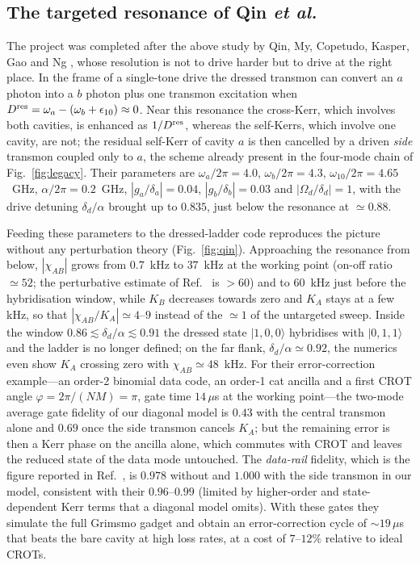 \documentclass[aps,pra,reprint,superscriptaddress,amsmath,amssymb,nofootinbib]{revtex4-2}
\newcommand{\ket}[1]{|#1\rangle}
\begin{document}
\subsection{The targeted resonance of Qin \emph{et al.}}
The project was completed after the above study by Qin, My, Copetudo,
Kasper, Gao and Ng \cite{qin2026}, whose resolution is not to drive harder
but to drive at the right place. In the frame of a single-tone drive the
dressed transmon can convert an $a$ photon into a $b$ photon plus one
transmon excitation when $D^{\rm res}=\omega_a-(\omega_b+\epsilon_{10})\approx0$.
Near this resonance the cross-Kerr, which involves both cavities, is
enhanced as $1/D^{\rm res}$, whereas the self-Kerrs, which involve one cavity,
are not; the residual self-Kerr of cavity $a$ is then cancelled by a driven
\emph{side} transmon coupled only to $a$, the scheme already present in the
four-mode chain of Fig.~\ref{fig:legacy}. Their parameters are
$\omega_a/2\pi=4.0$, $\omega_b/2\pi=4.3$, $\omega_{10}/2\pi=4.65$~GHz,
$\alpha/2\pi=0.2$~GHz, $|g_a/\delta_a|=0.04$, $|g_b/\delta_b|=0.03$ and
$|\Omega_d/\delta_d|=1$, with the drive detuning $\delta_d/\alpha$ brought
up to $0.835$, just below the resonance at $\simeq0.88$.

Feeding these parameters to the dressed-ladder code reproduces the picture
without any perturbation theory (Fig.~\ref{fig:qin}). Approaching the
resonance from below, $|\chi_{AB}|$ grows from $0.7$~kHz to $37$~kHz at the
working point (on-off ratio $\simeq52$; the perturbative estimate of
Ref.~\cite{qin2026} is $>60$) and to $60$~kHz just before the hybridisation
window, while $K_B$ decreases towards zero and $K_A$ stays at a few kHz, so
that $|\chi_{AB}/K_A|\simeq4$--$9$ instead of the $\simeq1$ of the untargeted
sweep. Inside the window $0.86\lesssim\delta_d/\alpha\lesssim0.91$ the dressed
state $\ket{1,0,0}$ hybridises with $\ket{0,1,1}$ and the ladder is no longer
defined; on the far flank, $\delta_d/\alpha\simeq0.92$, the numerics even show
$K_A$ crossing zero with $\chi_{AB}\simeq48$~kHz. For their
error-correction example---an order-2 binomial data code, an order-1 cat
ancilla and a first CROT angle $\varphi=2\pi/(NM)=\pi$, gate time
$14\,\mu$s at the working point---the two-mode average gate fidelity of our
diagonal model is $0.43$ with the central transmon alone and $0.69$ once the
side transmon cancels $K_A$; but the remaining error is then a Kerr phase on
the ancilla alone, which commutes with CROT and leaves the reduced state of
the data mode untouched. The \emph{data-rail} fidelity, which is the figure
reported in Ref.~\cite{qin2026}, is $0.978$ without and $1.000$ with the side
transmon in our model, consistent with their $0.96$--$0.99$ (limited by
higher-order and state-dependent Kerr terms that a diagonal model omits).
With these gates they simulate the full Grimsmo gadget and obtain an
error-correction cycle of $\sim19\,\mu$s that beats the bare cavity at high
loss rates, at a cost of $7$--$12\%$ relative to ideal CROTs.
\end{document}
